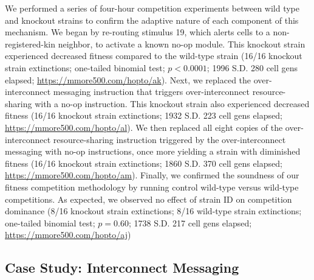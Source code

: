 We performed a series of four-hour competition experiments between wild type and knockout strains to confirm the adaptive nature of each component of this mechanism.
We began by re-routing stimulus 19, which alerts cells to a non-registered-kin neighbor, to activate a known no-op module.
This knockout strain experienced decreased fitness compared to the wild-type strain (16/16 knockout strain extinctions; one-tailed binomial test; $p < 0.0001$; 1996 S.D. 280 cell gens elapsed; \url{https://mmore500.com/hopto/ak}).
Next, we replaced the over-interconnect messaging instruction that triggers over-interconnect resource-sharing with a no-op instruction.
This knockout strain also experienced decreased fitness (16/16 knockout strain extinctions; 1932 S.D. 223 cell gens elapsed; \url{https://mmore500.com/hopto/al}).
We then replaced all eight copies of the over-interconnect resource-sharing instruction triggered by the over-interconnect messaging with no-op instructions, once more yielding a strain with diminished fitness (16/16 knockout strain extinctions; 1860 S.D. 370 cell gens elapsed; \url{https://mmore500.com/hopto/am}).
Finally, we confirmed the soundness of our fitness competition methodology by running control wild-type versus wild-type competitions.
As expected, we observed no effect of strain ID on competition dominance (8/16 knockout strain extinctions; 8/16 wild-type strain extinctions; one-tailed binomial test; $p = 0.60$; 1738 S.D. 217 cell gens elapsed; \url{https://mmore500.com/hopto/aj})

\subsection{Case Study: Interconnect Messaging}



